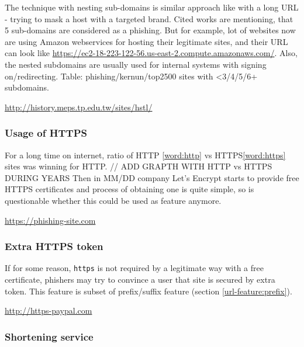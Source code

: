 \documentclass[
  digital, %
  oneside, %
  table,   %
  nolof,     %
  nolot,     %
]{fithesis3}
\newcounter{feature}
\newenvironment{feature}[1]{\stepcounter{feature}%
    \tcolorbox[beamer,%
    noparskip,breakable,
    colback=LightBlue,colframe=DarkBlue,%
    colbacklower=DarkBlue!75!LightBlue,%
    title=Feature~\thefeature: #1]}%
    {\endtcolorbox}
\begin{document}
The technique with nesting sub-domains is similar approach like with a long URL - trying to mask a host with a targeted brand. Cited works are mentioning, that 5 sub-domains are considered as a phishing. But for example, lot of websites now are using Amazon webservices \cite{aws} for hosting their legitimate sites, and their URL can look like \url{	https://ec2-18-223-122-56.us-east-2.compute.amazonaws.com/}. Also, the nested subdomains are usually used for internal systems with signing on/redirecting.
Table: phishing/kernun/top2500 sites with <3/4/5/6+ subdomains. 

\begin{feature}{Nested sub-domains}
\url{http://history.meps.tp.edu.tw/sites/hstl/}
\end{feature}

\subsubsection{Usage of HTTPS \cite{methodical-overview} \cite{url-features-work}}

For a long time on internet, ratio of HTTP \ref{word:http} vs HTTPS\ref{word:https} sites was winning for HTTP. \cite{apwg...}
// ADD GRAPTH WITH HTTP vs HTTPS DURING YEARS
Then in MM/DD company Let's Encrypt starts to provide free HTTPS certificates and process of obtaining one is quite simple, so is questionable whether this could be used as feature anymore.

\begin{feature}{Usage of HTTPS}
\url{https://phishing-site.com}
\end{feature}

\subsubsection{Extra HTTPS token \cite{fresh-phish}}

If for some reason, \texttt{https} is not required by a legitimate way with a free certificate, phishers may try to convince a user that site is secured by extra token. This feature is subset of prefix/suffix feature (section  \ref{url-feature:prefix}).

\begin{feature}{Extra HTTPS token}
\url{http://https-paypal.com}
\end{feature}

\subsubsection{Shortening service \cite{fresh-phish} \cite{phishstorm}}
\end{document}

